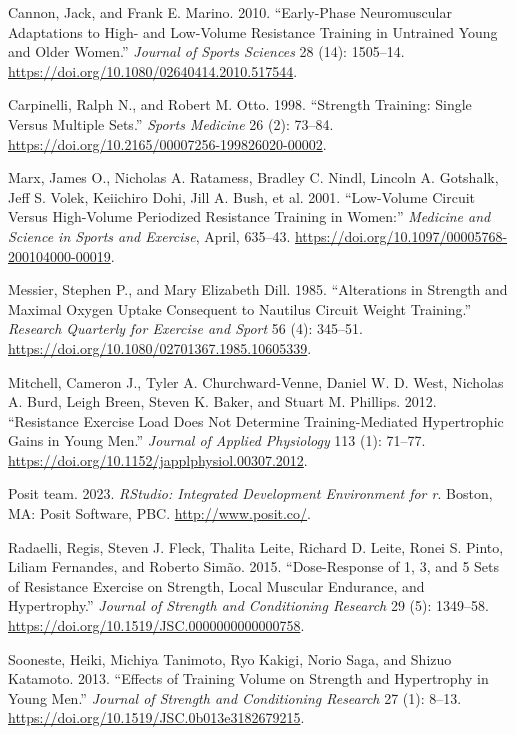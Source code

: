 \documentclass[
  letterpaper,
  DIV=11,
  numbers=noendperiod]{scrartcl}
\newlength{\cslhangindent}
\newlength{\cslentryspacingunit} %
\newenvironment{CSLReferences}[2] %
 {%
  \setlength{\parindent}{0pt}
  \ifodd #1
  \let\oldpar\par
  \def\par{\hangindent=\cslhangindent\oldpar}
  \fi
  \setlength{\parskip}{#2\cslentryspacingunit}
 }%
 {}
\begin{document}
\hypertarget{refs}{}
\begin{CSLReferences}{1}{0}
\leavevmode{}%
Cannon, Jack, and Frank E. Marino. 2010. {``Early-Phase Neuromuscular
Adaptations to High- and Low-Volume Resistance Training in Untrained
Young and Older Women.''} \emph{Journal of Sports Sciences} 28 (14):
1505--14. \url{https://doi.org/10.1080/02640414.2010.517544}.

\leavevmode{}%
Carpinelli, Ralph N., and Robert M. Otto. 1998. {``Strength Training:
Single Versus Multiple Sets.''} \emph{Sports Medicine} 26 (2): 73--84.
\url{https://doi.org/10.2165/00007256-199826020-00002}.

\leavevmode{}%
Marx, James O., Nicholas A. Ratamess, Bradley C. Nindl, Lincoln A.
Gotshalk, Jeff S. Volek, Keiichiro Dohi, Jill A. Bush, et al. 2001.
{``Low-Volume Circuit Versus High-Volume Periodized Resistance Training
in Women:''} \emph{Medicine and Science in Sports and Exercise}, April,
635--43. \url{https://doi.org/10.1097/00005768-200104000-00019}.

\leavevmode{}%
Messier, Stephen P., and Mary Elizabeth Dill. 1985. {``Alterations in
Strength and Maximal Oxygen Uptake Consequent to Nautilus Circuit Weight
Training.''} \emph{Research Quarterly for Exercise and Sport} 56 (4):
345--51. \url{https://doi.org/10.1080/02701367.1985.10605339}.

\leavevmode{}%
Mitchell, Cameron J., Tyler A. Churchward-Venne, Daniel W. D. West,
Nicholas A. Burd, Leigh Breen, Steven K. Baker, and Stuart M. Phillips.
2012. {``Resistance Exercise Load Does Not Determine Training-Mediated
Hypertrophic Gains in Young Men.''} \emph{Journal of Applied Physiology}
113 (1): 71--77. \url{https://doi.org/10.1152/japplphysiol.00307.2012}.

\leavevmode{}%
Posit team. 2023. \emph{RStudio: Integrated Development Environment for
r}. Boston, MA: Posit Software, PBC. \url{http://www.posit.co/}.

\leavevmode{}%
Radaelli, Regis, Steven J. Fleck, Thalita Leite, Richard D. Leite, Ronei
S. Pinto, Liliam Fernandes, and Roberto Simão. 2015. {``Dose-Response of
1, 3, and 5 Sets of Resistance Exercise on Strength, Local Muscular
Endurance, and Hypertrophy.''} \emph{Journal of Strength and
Conditioning Research} 29 (5): 1349--58.
\url{https://doi.org/10.1519/JSC.0000000000000758}.

\leavevmode{}%
Sooneste, Heiki, Michiya Tanimoto, Ryo Kakigi, Norio Saga, and Shizuo
Katamoto. 2013. {``Effects of Training Volume on Strength and
Hypertrophy in Young Men.''} \emph{Journal of Strength and Conditioning
Research} 27 (1): 8--13.
\url{https://doi.org/10.1519/JSC.0b013e3182679215}.

\end{CSLReferences}
\end{document}
